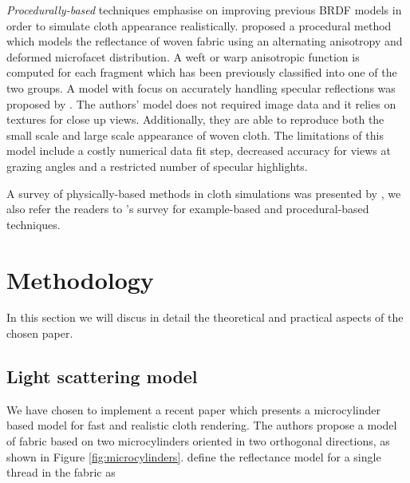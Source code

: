 \documentclass[12pt]{article}
\begin{document}
\emph{Procedurally-based} techniques emphasise on improving previous BRDF models in order to simulate cloth appearance realistically.
\citeauthor{Kang2010} \cite{Kang2010} proposed a procedural method which models the reflectance of woven fabric using an alternating anisotropy and deformed microfacet distribution.
A weft or warp anisotropic function is computed for each fragment which has been previously classified into one of the two groups.
A model with focus on accurately handling specular reflections was proposed by \citeauthor{Irawan2012} \cite{Irawan2012}.
The authors' model does not required image data and it relies on textures for close up views.
Additionally, they are able to reproduce both the small scale and large scale appearance of woven cloth.
The limitations of this model include a costly numerical data fit step, decreased accuracy for views at grazing angles and a restricted number of specular highlights.

A survey of physically-based methods in cloth simulations was presented by \citeauthor{Schroder2012} \cite{Schroder2012}, we also refer the readers to \citeauthor{Yuen2011}'s \cite{Yuen2011} survey for example-based and procedural-based techniques.

\section{Methodology}

In this section we will discus in detail the theoretical and practical aspects of the chosen paper.

\subsection{Light scattering model}
\label{sec:light_scattering_model}
We have chosen to implement a recent paper \cite{Sadeghi2013} which presents a microcylinder based model for fast and realistic cloth rendering.
The authors propose a model of fabric based on two microcylinders oriented in two orthogonal directions, as shown in Figure \ref{fig:microcylinders}.
\citeauthor{Sadeghi2013} define the reflectance model for a single thread in the fabric as
\end{document}
